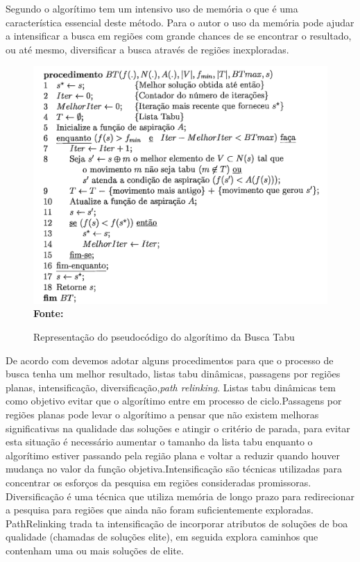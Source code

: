 Segundo \cite{armentanointroduccao}  o algorítimo tem um intensivo uso de memória o que é uma característica essencial deste método. Para o autor o uso da memória pode ajudar a intensificar a busca em regiões com grande chances de se encontrar o resultado, ou até mesmo, diversificar a busca através de regiões inexploradas.
\begin{figure}[!htb]
\caption[Representação do pseudocódigo do algorítimo da Busca Tabu]{Representação do pseudocódigo do algorítimo da Busca Tabu}
\label{fig:figura2}
\centering
\includegraphics[scale=0.50]{imagens/representacaoBuscaTabu.png}
\\ \textbf{\footnotesize Fonte: \cite{souza2000}}
\end{figure}

De acordo com \cite{armentanointroduccao}  devemos adotar alguns procedimentos para que o processo de busca tenha um melhor resultado, listas tabu dinâmicas, passagens por regiões planas, intensificação, diversificação,\textit{path relinking}. Listas tabu dinâmicas tem como objetivo evitar que o algorítimo entre em processo de ciclo.Passagens por regiões planas pode levar o algorítimo a pensar que não existem melhoras significativas na qualidade das soluções e atingir o critério de parada, para evitar esta situação é necessário aumentar o tamanho da lista tabu enquanto o algorítimo estiver passando pela região plana e voltar a reduzir quando houver mudança no valor da função objetiva.Intensificação são técnicas utilizadas para concentrar os esforços da pesquisa em regiões consideradas promissoras. Diversificação é uma técnica que utiliza memória de longo prazo para redirecionar a pesquisa para regiões que ainda não foram suficientemente exploradas. PathRelinking trada ta intensificação de incorporar atributos de soluções de boa qualidade (chamadas de soluções elite), em seguida explora caminhos que contenham uma ou mais soluções de elite.

